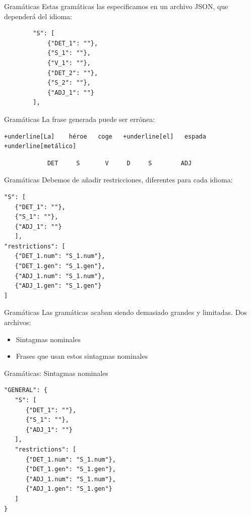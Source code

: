 \begin{frame}[t, fragile]{Gramáticas}
Estas gramáticas las especificamos en un archivo JSON, que dependerá del idioma:
	\begin{verbatim}
		"S": [
	    	{"DET_1": ""},
	    	{"S_1": ""},
	    	{"V_1": ""},
	    	{"DET_2": ""},
	    	{"S_2": ""},
	    	{"ADJ_1": ""}
		],
	\end{verbatim}
\end{frame}

\begin{frame}[t, fragile]{Gramáticas}
La frase generada puede ser errónea:
	\vspace*{\fill}
		\begin{Verbatim}[commandchars=+\[\]]
+underline[La]    héroe   coge   +underline[el]   espada   +underline[metálico]
		\end{Verbatim}
		\begin{verbatim}
			DET     S       V     D     S        ADJ
		\end{verbatim}
	\vspace*{\fill}
\end{frame}

\begin{frame}[t, fragile]{Gramáticas}
	Debemos de añadir restricciones, diferentes para cada idioma:
	\begin{verbatim}
"S": [
   {"DET_1": ""},
   {"S_1": ""},
   {"ADJ_1": ""}
   ],
"restrictions": [
   {"DET_1.num": "S_1.num"},
   {"DET_1.gen": "S_1.gen"},
   {"ADJ_1.num": "S_1.num"},
   {"ADJ_1.gen": "S_1.gen"}
]
	\end{verbatim}
\end{frame}

\begin{frame}[t, fragile]{Gramáticas}
	Las gramáticas acaban siendo demasiado grandes y limitadas. Dos archivos:
	\begin{itemize}
		\item<+-| alert@+> Sintagmas nominales
		\item Frases que usan estos sintagmas nominales
	\end{itemize}
\end{frame}

\begin{frame}[t, fragile]{Gramáticas: Sintagmas nominales}
	\begin{Verbatim}
"GENERAL": {
   "S": [
      {"DET_1": ""}, 
      {"S_1": ""},
      {"ADJ_1": ""}
   ],
   "restrictions": [
      {"DET_1.num": "S_1.num"},
      {"DET_1.gen": "S_1.gen"},
      {"ADJ_1.num": "S_1.num"},
      {"ADJ_1.gen": "S_1.gen"}
   ]
}
	\end{Verbatim}
\end{frame}

